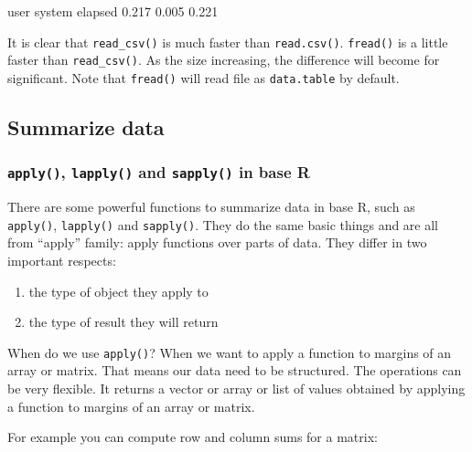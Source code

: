 \documentclass[12pt,]{krantz}
\makeatletter
\newenvironment{Shaded}{\begin{snugshade}}{\end{snugshade}}
\newcommand{\NormalTok}[1]{#1}
\providecommand{\tightlist}{%
  \setlength{\itemsep}{0pt}\setlength{\parskip}{0pt}}
\newenvironment{kframe}{%
\medskip{}
\setlength{\fboxsep}{.8em}
 \def\at@end@of@kframe{}%
 \ifinner\ifhmode%
  \def\at@end@of@kframe{\end{minipage}}%
  \begin{minipage}{\columnwidth}%
 \fi\fi%
 \def\FrameCommand##1{\hskip\@totalleftmargin \hskip-\fboxsep
 \colorbox{shadecolor}{##1}\hskip-\fboxsep
     \hskip-\linewidth \hskip-\@totalleftmargin \hskip\columnwidth}%
 \MakeFramed {\advance\hsize-\width
   \@totalleftmargin\z@ \linewidth\hsize
   \@setminipage}}%
 {\par\unskip\endMakeFramed%
 \at@end@of@kframe}
\renewenvironment{Shaded}{\begin{kframe}}{\end{kframe}}
\theoremstyle{definition}
\theoremstyle{definition}
\theoremstyle{definition}
\theoremstyle{remark}
\makeatother
\begin{document}
\begin{Shaded}
\begin{Highlighting}[]
\NormalTok{   user  system elapsed }
\NormalTok{  0.217   0.005   0.221 }
\end{Highlighting}
\end{Shaded}

It is clear that \texttt{read\_csv()} is much faster than
\texttt{read.csv()}. \texttt{fread()} is a little faster than
\texttt{read\_csv()}. As the size increasing, the difference will become
for significant. Note that \texttt{fread()} will read file as
\texttt{data.table} by default.

\subsection{Summarize data}\label{summarize-data}

\subsubsection{\texorpdfstring{\texttt{apply()}, \texttt{lapply()} and
\texttt{sapply()} in base
R}{apply(), lapply() and sapply() in base R}}\label{apply-lapply-and-sapply-in-base-r}

There are some powerful functions to summarize data in base R, such as
\texttt{apply()}, \texttt{lapply()} and \texttt{sapply()}. They do the
same basic things and are all from ``apply'' family: apply functions
over parts of data. They differ in two important respects:

\begin{enumerate}
\def\labelenumi{\arabic{enumi}.}
\tightlist
\item
  the type of object they apply to
\item
  the type of result they will return
\end{enumerate}

When do we use \texttt{apply()}? When we want to apply a function to
margins of an array or matrix. That means our data need to be
structured. The operations can be very flexible. It returns a vector or
array or list of values obtained by applying a function to margins of an
array or matrix.

For example you can compute row and column sums for a matrix:
\end{document}
